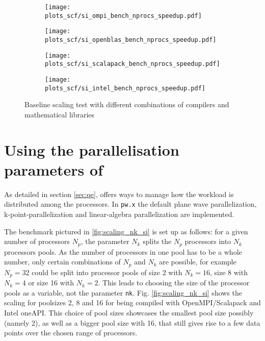 \documentclass[main.tex]{subfiles}
\begin{document}
\begin{figure}[h!]
\begin{subfigure}[b]{0.4\textwidth}
    \centering
    \texttt{[image: plots\_scf/si\_ompi\_bench\_nprocs\_speedup.pdf]}
\end{subfigure}
\begin{subfigure}[b]{0.4\textwidth}
    \centering
    \texttt{[image: plots\_scf/si\_openblas\_bench\_nprocs\_speedup.pdf]}
\end{subfigure}
\begin{subfigure}[b]{0.4\textwidth}
    \centering
    \texttt{[image: plots\_scf/si\_scalapack\_bench\_nprocs\_speedup.pdf]}
\end{subfigure}
\begin{subfigure}[b]{0.4\textwidth}
    \centering
    \texttt{[image: plots\_scf/si\_intel\_bench\_nprocs\_speedup.pdf]}
\end{subfigure}
\caption{Baseline scaling test with different combinations of compilers and mathematical libraries}
\label{fig:scaling_compilers_nprocs}
\end{figure}


\section{Using the parallelisation parameters of \QE}

As detailed in section \ref{sec:qe}, \QE offers ways to manage how the workload is distributed among the processors.
In \texttt{pw.x} the default plane wave parallelization, k-point-parallelization and linear-algebra parallelization are implemented.

The benchmark pictured in \ref{fig:scaling_nk_si} is set up as follows: for a given number of processors \(N_p\), the parameter \(N_k\) splits the \(N_p\) processors into \(N_k\) processors pools.
As the number of processors in one pool has to be a whole number, only certain combinations of \(N_p\) and \(N_k\) are possible, for example \(N_p = 32\) could be split into processor pools of size 2 with \(N_k = 16\), size 8 with \(N_k = 4\) or size 16 with \(N_k = 2\).
This leads to choosing the size of the processor pools as a variable, not the parameter \texttt{nk}.
Fig. \ref{fig:scaling_nk_si} shows the scaling for poolsizes 2, 8 and 16 for \QE being compiled with OpenMPI/Scalapack and Intel oneAPI.
This choice of pool sizes showcases the smallest pool size possibly (namely 2), as well as a bigger pool size with 16, that still gives rise to a few data points over the chosen range of processors.
\end{document}
